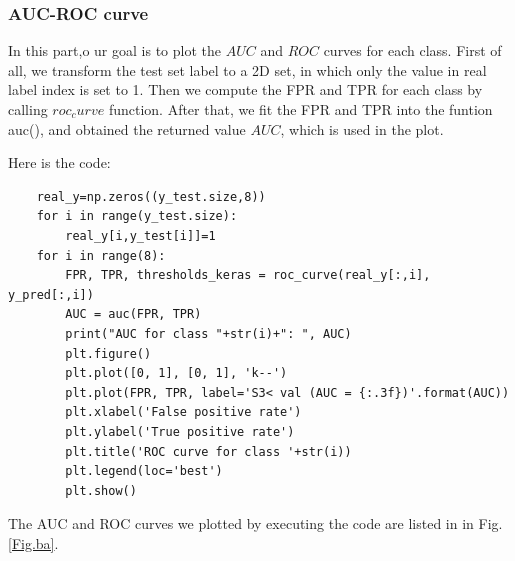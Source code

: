 \documentclass[conference]{IEEEtran}
\begin{document}
\subsubsection{AUC-ROC curve}
In this part,o ur goal is to plot the $AUC$ and $ROC$ curves for each class.
First of all, we transform the test set label to a 2D set, in which only the value in real label index is set to 1.
Then we compute the FPR and TPR for each class by calling $roc_curve$ function.
After that, we fit the FPR and TPR into the funtion auc(), and obtained the returned value $AUC$, which is used in the plot.\par
Here is the code:
\begin{lstlisting}
    real_y=np.zeros((y_test.size,8))
    for i in range(y_test.size):
        real_y[i,y_test[i]]=1
    for i in range(8):
        FPR, TPR, thresholds_keras = roc_curve(real_y[:,i], y_pred[:,i]) 
        AUC = auc(FPR, TPR)  
        print("AUC for class "+str(i)+": ", AUC)
        plt.figure()
        plt.plot([0, 1], [0, 1], 'k--')
        plt.plot(FPR, TPR, label='S3< val (AUC = {:.3f})'.format(AUC))
        plt.xlabel('False positive rate')
        plt.ylabel('True positive rate')
        plt.title('ROC curve for class '+str(i))
        plt.legend(loc='best')
        plt.show()    
\end{lstlisting}

The AUC and ROC curves we plotted by executing the code are listed in in Fig. \ref{Fig.ba}.
\end{document}
